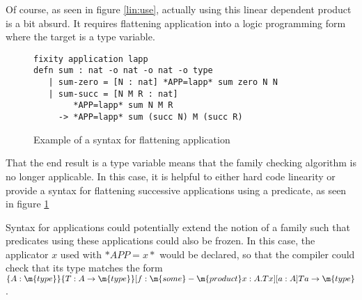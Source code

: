Of course, as seen in figure \ref{lin:use}, actually using this linear dependent product is a bit
absurd.  It requires flattening application into a logic programming form where the target
is a type variable.


\begin{figure}[H]
\begin{lstlisting}
fixity application lapp
defn sum : nat -o nat -o nat -o type
   | sum-zero = [N : nat] *APP=lapp* sum zero N N
   | sum-succ = [N M R : nat] 
        *APP=lapp* sum N M R 
     -> *APP=lapp* sum (succ N) M (succ R)
\end{lstlisting}
\caption{Example of a syntax for flattening application}
\label{lin:flat}
\end{figure}


That the end result is a type variable means that the family checking algorithm
is no longer applicable. In this case, it is helpful to either hard code
linearity or provide a syntax for flattening successive applications using a predicate, as
seen in figure \ref{lin:flat}

Syntax for applications could potentially extend the notion of a family such that
predicates using these applications could also be frozen. In this case, the applicator $x$ used with 
$*APP = x*$ would be declared, so that the compiler could check that its type matches the form $\{ A : \m{type} \}\{ T : A \rightarrow \m{type} \}[f : \m{some}-\m{product} x : A . T x] [ a : A] T a \rightarrow \m{type}$.
